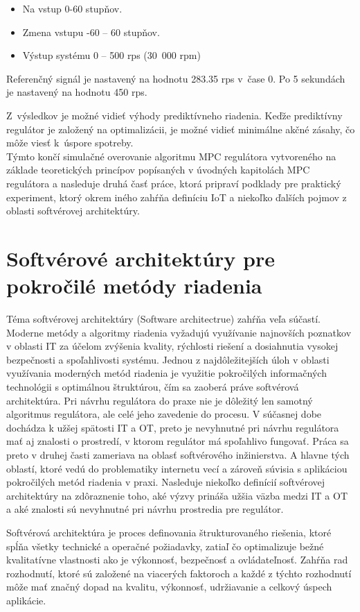 \begin{itemize}
\item
  Na vstup 0-60 stupňov.
\item
  Zmena vstupu -60 -- 60 stupňov.
\item
  Výstup systému 0 -- 500 rps (30~000 rpm)
\end{itemize}

Referenčný signál je nastavený na hodnotu 283.35 rps v~čase 0. Po 5
sekundách je nastavený na hodnotu 450 rps.

Z~výsledkov je možné vidieť výhody prediktívneho riadenia. Keďže
prediktívny regulátor je založený na optimalizácii, je možné vidieť
minimálne akčné zásahy, čo môže viesť k~úspore spotreby.\cite{MPC08}\\
Týmto končí simulačné overovanie algoritmu MPC regulátora vytvoreného na základe teoretických princípov popísaných v úvodných kapitolách MPC regulátora a nasleduje druhá časť práce, ktorá pripraví podklady pre  praktický experiment, ktorý okrem iného zahŕňa definíciu IoT a niekoľko ďalších pojmov z oblasti softvérovej architektúry.

\section{Softvérové architektúry pre pokročilé metódy riadenia}
Téma softvérovej architektúry (Software architectrue) zahŕňa veľa súčastí. Moderne metódy a algoritmy riadenia vyžadujú využívanie najnovších poznatkov v oblasti IT za účelom zvýšenia kvality, rýchlosti riešení a dosiahnutia vysokej bezpečnosti a spoľahlivosti systému. Jednou z najdôležitejších úloh v oblasti využívania moderných metód riadenia je využitie pokročilých informačných technológii s optimálnou štruktúrou, čím sa zaoberá práve softvérová architektúra. Pri návrhu regulátora do praxe nie je dôležitý len samotný algoritmus regulátora, ale celé jeho zavedenie do procesu. V súčasnej dobe dochádza k užšej spätosti IT a OT, preto je nevyhnutné pri návrhu regulátora mať aj znalosti o prostredí, v ktorom regulátor má spoľahlivo fungovať. Práca sa preto v druhej časti zameriava na oblasť softvérového inžinierstva. A hlavne tých oblastí, ktoré vedú do problematiky internetu vecí a zároveň súvisia s aplikáciou pokročilých metód riadenia v praxi. Nasleduje niekoľko definícií softvérovej architektúry na zdôraznenie toho, aké výzvy prináša užšia väzba medzi IT a OT a aké znalosti sú nevyhnutné pri návrhu prostredia pre regulátor.

\indent Softvérová architektúra je proces definovania štrukturovaného riešenia, ktoré spĺňa všetky technické a operačné požiadavky, zatiaľ čo optimalizuje bežné kvalitatívne vlastnosti ako je výkonnosť, bezpečnosť a ovládateľnosť. Zahŕňa rad rozhodnutí, ktoré sú založené na viacerých faktoroch a každé z týchto rozhodnutí môže mať značný dopad na kvalitu, výkonnosť, udržiavanie a celkový úspech aplikácie.

